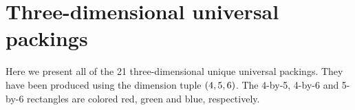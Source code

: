 \section{Three-dimensional universal packings}\label{appendix-A}
\noindent Here we present all of the 21 three-dimensional unique universal packings. They have been produced using the dimension tuple $\left( 4, 5, 6 \right)$. The 4-by-5, 4-by-6 and 5-by-6 rectangles are colored red, green and blue, respectively.

\vspace*{\fill}

\vspace*{\fill}
